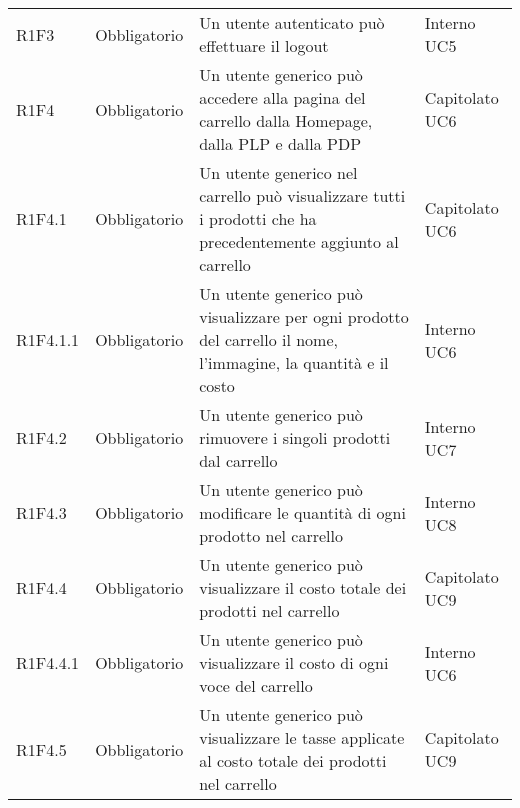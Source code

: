 {\begin{longtable}{C{2.5cm} C{2.8cm} C{6.7cm} C{2.5cm}}

R1F3 & Obbligatorio & Un utente autenticato può effettuare il logout & Interno \newline UC5 \\


R1F4 & Obbligatorio & Un utente generico può accedere alla pagina del carrello dalla Homepage, dalla PLP e dalla PDP & Capitolato \newline UC6 \\
R1F4.1 & Obbligatorio & Un utente generico nel carrello può visualizzare tutti i prodotti che ha precedentemente aggiunto al carrello & Capitolato \newline UC6 \\
R1F4.1.1 & Obbligatorio & Un utente generico può visualizzare per ogni prodotto del carrello il nome, l'immagine, la quantità e il costo & Interno \newline UC6 \\
R1F4.2 & Obbligatorio & Un utente generico può rimuovere i singoli prodotti dal carrello & Interno \newline UC7 \\
R1F4.3 & Obbligatorio & Un utente generico può modificare le quantità di ogni prodotto nel carrello & Interno \newline UC8\\
R1F4.4 & Obbligatorio & Un utente generico può visualizzare il costo totale dei prodotti nel carrello & Capitolato \newline UC9\\
R1F4.4.1 & Obbligatorio & Un utente generico può visualizzare il costo di ogni voce del carrello & Interno \newline UC6\\
R1F4.5 & Obbligatorio & Un utente generico può visualizzare le tasse applicate al costo totale dei prodotti nel carrello & Capitolato \newline UC9\\



\end{longtable}}

